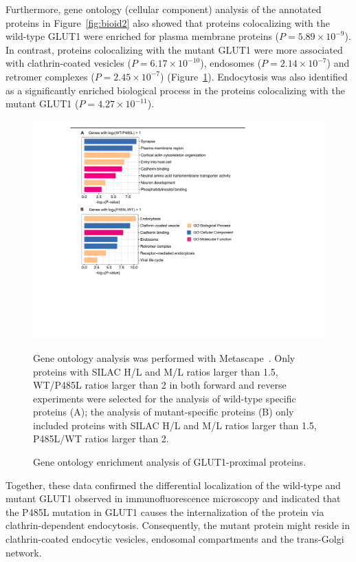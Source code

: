 Furthermore, gene ontology (cellular component) analysis of the annotated proteins in Figure~\ref{fig:bioid2} also showed that proteins colocalizing with the wild-type GLUT1 were enriched for plasma membrane proteins ($P=5.89\times 10^{-9}$). In contrast, proteins colocalizing with the mutant GLUT1 were more associated with clathrin-coated vesicles ($P=6.17\times 10^{-10}$), endosomes ($P=2.14\times 10^{-7}$) and retromer complexes ($P=2.45\times 10^{-7}$) (Figure~\ref{fig:go}). Endocytosis was also identified as a significantly enriched biological process in the proteins colocalizing with the mutant GLUT1 ($P=4.27\times 10^{-11}$).
\begin{figure}[h]
\centering
\includegraphics[scale=0.7]{Figures/GO}
\caption{Gene ontology enrichment analysis of GLUT1-proximal proteins.}
\vspace*{-3mm}
\small \justify
Gene ontology analysis was performed with Metascape~\cite{Tripathi}. Only proteins with SILAC H/L and M/L ratios larger than 1.5, WT/P485L ratios larger than 2 in both forward and reverse experiments were selected for the analysis of wild-type specific proteins (A); the analysis of mutant-specific proteins (B) only included proteins with SILAC H/L and M/L ratios larger than 1.5, P485L/WT ratios larger than 2.
\label{fig:go}
\end{figure}

Together, these data confirmed the differential localization of the wild-type and mutant GLUT1 observed in immunofluorescence microscopy and indicated that the P485L mutation in GLUT1 causes the internalization of the protein via clathrin-dependent endocytosis. Consequently, the mutant protein might reside in clathrin-coated endocytic vesicles, endosomal compartments and the trans-Golgi network.
